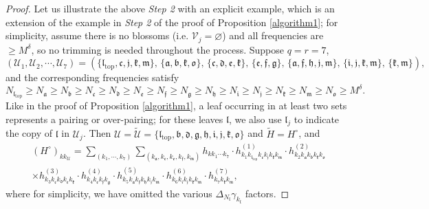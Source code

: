 \documentclass[11 pt,reqno]{amsart}
\theoremstyle{definition}
\theoremstyle{remark}
\numberwithin{equation}{section}
\newcommand{\Uc}{\mathcal{U}}
\newcommand{\Vc}{\mathcal{V}}
\newcommand{\ff}{\mathfrak{f}}
\newcommand{\hf}{\mathfrak{h}}
\newcommand{\lf}{\mathfrak{l}}
\newcommand{\mf}{\mathfrak{m}}
\newcommand{\af}{\mathfrak{a}}
\newcommand{\bff}{\mathfrak{b}}
\newcommand{\cf}{\mathfrak{c}}
\newcommand{\dff}{\mathfrak{d}}
\newcommand{\ef}{\mathfrak{e}}
\newcommand{\gf}{\mathfrak{g}}
\newcommand{\iif}{\mathfrak{i}}
\newcommand{\jf}{\mathfrak{j}}
\newcommand{\kf}{\mathfrak{k}}
\newcommand{\of}{\mathfrak{o}}
\begin{document}
{\begin{proof}
Let us illustrate the above \emph{Step 2} with an explicit example, which is an extension of the example in \emph{Step 2} of the proof of Proposition \ref{algorithm1}; for simplicity, assume there is no blossoms (i.e. $\Vc_j=\varnothing$) and all frequencies are $\geq M^\delta$, so no trimming is needed throughout the process. Suppose $q=r=7$, \[(\Uc_1,\Uc_2,\cdots,\Uc_7)= (\{\lf_{\mathrm{top}}, \cf, \jf, \kf, \mf\},\,\{\af, \bff, \kf,\of\},\,\{\cf, \dff, \ef, \kf\},\,\{\ef, \ff, \gf\},\,\{\af, \ff, \hf, \jf, \mf\},\,\{\iif, \jf, \kf,\mf\},\,\{\kf,\mf\}),\] and the corresponding frequencies satisfy \[N_{\lf_{\mathrm{top}}}\geq N_\af\geq N_{\bff}\geq N_{\cf}\geq N_{\dff}\geq N_{\ef}\geq N_{\ff}\geq N_{\gf}\geq N_{\hf} \geq N_{\iif}\geq N_{\jf}\geq N_{\kf}\geq N_{\mf}\geq N_{\of}\geq M^\delta.\] Like in the proof of Proposition \ref{algorithm1}, a leaf occurring in at least two sets represents a pairing or over-pairing; for these leaves $\lf$, we also use $\lf_j$ to indicate the copy of $\lf$ in $\Uc_j$. Then $\Uc =\widetilde{\Uc} =\{\lf_{\mathrm{top}},\bff,\dff, \gf, \hf,\iif,\jf,\kf,\of\}$ and $\widetilde{H}=H^{\circ}$, and
\begin{multline*}(H^\circ)_{kk_\Uc}=\sum_{(k_1,\cdots,k_7)}\sum_{(k_\af,k_\cf,k_\ef,k_\ff,k_\mf)}h_{kk_1\cdots k_7}\cdot h^{(1)}_{k_1k_{\lf_{\mathrm{top}}}k_\cf k_\jf k_\kf k_\mf}\cdot h^{(2)}_{k_2k_\af k_\bff k_\kf k_\of}\\\times h^{(3)}_{k_3k_\cf k_\dff k_\ef k_\kf}\cdot h^{(4)}_{k_4k_\ef k_\ff k_\gf}\cdot h^{(5)}_{k_5k_\af k_\ff k_\hf k_\jf k_\mf}\cdot h^{(6)}_{k_6 k_\iif k_\jf k_\kf k_\mf}\cdot h^{(7)}_{k_7k_\kf k_\mf},
\end{multline*} where for simplicity,  we have omitted the various $\Delta_{N_\lf}\gamma_{k_\lf}$ factors.


\end{proof}}
\end{document}
